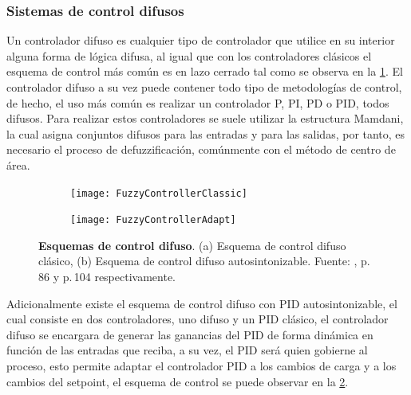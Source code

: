         \subsubsection{Sistemas de control difusos}
            
            Un controlador difuso es cualquier tipo de controlador que utilice en su interior alguna forma de lógica difusa, al igual que con los controladores clásicos el esquema de control más común es en lazo cerrado tal como se observa en la \cref{fig:fuzzycontrollerclassic}. El controlador difuso a su vez puede contener todo tipo de metodologías de control, de hecho, el uso más común es realizar un controlador P, PI, PD o PID, todos difusos. Para realizar estos controladores se suele utilizar la estructura Mamdani, la cual asigna conjuntos difusos para las entradas y para las salidas, por tanto, es necesario el proceso de defuzzificación, comúnmente con el método de centro de área.
                    
            \begin{figure}[htb]
                \centering
                \begin{subfigure}[t]{0.8\textwidth}
                    \centering
                    \texttt{[image: FuzzyControllerClassic]} %
                    \caption{} 
                    \label{fig:fuzzycontrollerclassic}
                \end{subfigure}
                \hfill
                \begin{subfigure}[t]{0.8\textwidth}
                    \centering
                    \texttt{[image: FuzzyControllerAdapt]} %
                    \caption{}
                    \label{fig:fuzzycontrolleradapt}
                \end{subfigure}
                
                \caption[Esquemas de control difuso]{\textbf{Esquemas de control difuso}. (a) Esquema de control difuso clásico, (b) Esquema de control difuso autosintonizable. Fuente: \textcite{cruz2010inteligencia}, p.$\,$86 y p.$\,$104 respectivamente. \label{fig:FuzzySchems}}
            \end{figure}
            
            Adicionalmente existe el esquema de control difuso con PID autosintonizable, el cual consiste en dos controladores, uno difuso y un PID clásico, el controlador difuso se encargara de generar las ganancias del PID de forma dinámica en función de las entradas que reciba, a su vez, el PID será quien gobierne al proceso, esto permite adaptar el controlador PID a los cambios de carga y a los cambios del setpoint, el esquema de control se puede observar en la \cref{fig:fuzzycontrolleradapt}.

